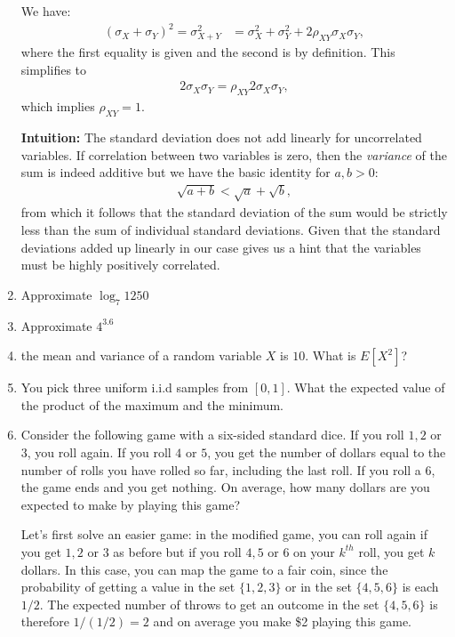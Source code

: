 \documentclass{amsart}
\theoremstyle{plain}
\numberwithin{equation}{section}
\begin{document}
\begin{enumerate}
We have:
\begin{align*}
(\sigma_X + \sigma_Y)^2 = \sigma_{X+Y}^2 &= \sigma_{X}^2 + \sigma_{Y}^2 + 
2 \rho_{XY} \sigma_X \sigma_Y,
\end{align*}
where the first equality is given and the second is by 
definition. This simplifies to 
\begin{align*}
2\sigma_X \sigma_Y = \rho_{XY} 2\sigma_X \sigma_Y,
\end{align*}
which implies $\rho_{XY} = 1$.

\textbf{Intuition:} The standard deviation
does not add linearly for uncorrelated variables. 
If correlation between two variables is zero, then 
the \emph{variance} of the sum is indeed additive
but we have the basic identity for $a, b>0$:
\begin{align*}
\sqrt{a + b}<\sqrt{a} + \sqrt{b},
\end{align*}
from which it follows that the standard deviation of 
the sum would be
strictly less than the sum of individual 
standard deviations. Given that the standard 
deviations added up linearly in our case gives us 
a hint that the variables must be highly positively correlated. 


\item Approximate $\log_{7}1250$ 

\item Approximate $4^{3.6}$

\item the mean and variance of a random variable $X$ is $10$. What is
$E[X^2]$?

\item You pick three uniform i.i.d samples from $[0,1]$. What the 
expected value of the product of the maximum and the minimum.

\item Consider the following game with a six-sided standard dice. 
If you roll $1,2$ or $3$, you roll again. If you 
roll $4$ or $5$, you get the number of dollars equal 
to the number of rolls you have rolled so far, including the last
roll. If you roll a $6$, the game ends and you get nothing. On 
average, how many dollars are you expected to make by 
playing this game?

Let's first solve an easier game: in the modified game, you can
roll again if you get $1, 2$ or $3$ as before but 
if you roll $4,5$ or $6$ on your $k^{th}$ roll, you get 
$k$ dollars. In this case, you can map the game to a fair 
coin, since the 
probability of getting a value in the set $\{ 1,2,3 \}$ or 
in the set $\{ 4,5,6 \}$ is each $1/2$. The expected number of 
throws to get an outcome in the set $\{4, 5, 6 \}$ is 
therefore $1/(1/2)=2$ and on average you make \$2 playing this 
game. 


\end{enumerate}
\end{document}
